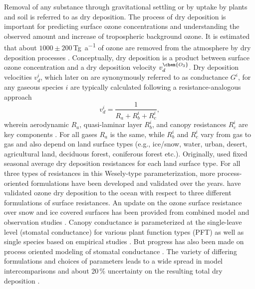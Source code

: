 \documentclass[gmd, manuscript]{copernicus}
\begin{document}
Removal of any substance through gravitational settling or by uptake by plants and soil is referred to as dry deposition. The process of dry deposition is important for predicting surface ozone concentrations and understanding the observed amount and increase of tropospheric background ozone. It is estimated that about $1000 \pm 200$\,\unit{Tg a^{-1}} of ozone are removed from the atmosphere by dry deposition processes \citep{ACP:Monks2015}. Conceptually, dry deposition is a product between surface ozone concentration  and a dry deposition velocity $v^\chem{O_3}_d$. Dry deposition velocities $v^i_d$, which later on are synonymously referred to as conductance $G^i$, for any gaseous species $i$ are typically calculated following a resistance-analogous approach
\begin{equation}
  v^i_d = \frac{1}{R_a + R^i_b + R^i_c},
  \label{eq:drydep_velo}
\end{equation}
wherein aerodynamic $R_a$, quasi-laminar layer $R^i_b$, and canopy resistances $R^i_c$ are key components \citep{AE:Wesely1989}. For all gases $R_a$ is the same, while $R^i_b$ and $R^i_c$ vary from gas to gas and also depend on land surface types (e.g., ice/snow, water, urban, desert, agricultural land, deciduous forest, coniferous forest etc.). Originally, \citet{AE:Wesely1989} used fixed seasonal average dry deposition resistances for each land surface type. For all three types of resistances in this Wesely-type parameterization, more process-oriented formulations have been developed and validated over the years. \citet{ACP:Luhar2017} have validated ozone dry deposition to the ocean with respect to three different formulations of surface resistances. An update on the ozone surface resistance over snow and ice covered surfaces has been provided from combined model and observation studies \citep[][$v^\chem{O_3}_\text{ice/snow} = 1/10000\,\unit{cm s^{-1}}$]{ACP:Helmig2007}. Canopy conductance is parameterized at the single-leave level (stomatal conductance) for various plant function types (PFT) as well as single species based on empirical studies \citep{PTRS:Jarvis1976, BallBerry1987, ACP:Simpson2012, ICP:MappingManual2017}. But progress has also been made on process oriented modeling of stomatal conductance \citep{AFM:Anderson2000,PP:Buckley2017}. The variety of differing formulations and choices of parameters leads to a wide spread in model intercomparisons \citep{ACP:Hardacre2015,AE:Derwent2018} and about 20\,\unit{\%} uncertainty on the resulting total dry deposition \citep{ACP:Monks2015}.\\
\end{document}
